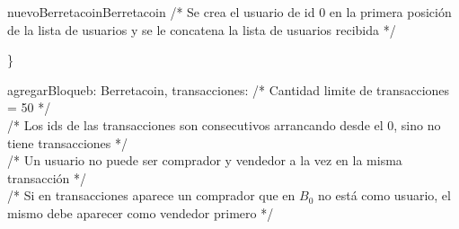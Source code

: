 \documentclass[10pt,a4paper]{article}
\begin{document}
\begin{tcolorbox}
        \begin{proc}{nuevoBerretacoin}{}{Berretacoin}
            \textcolor{babyblue}{/* Se crea el usuario de id 0 en la primera posición de la lista de usuarios y se le concatena la lista de usuarios recibida */} \\
        \end{proc} \}
        \vspace{0.3em}
        \begin{proc}{agregarBloque}{\Inout b: Berretacoin, \In transacciones: }{}
            \textcolor{babyblue}{/* Cantidad limite de transacciones = 50 */} \\
            \textcolor{babyblue}{/* Los ids de las transacciones son consecutivos arrancando desde el 0, sino no tiene transacciones */} \\
            \textcolor{babyblue}{/* Un usuario no puede ser comprador y vendedor a la vez en la misma transacción */} \\
            \textcolor{babyblue}{/* Si en transacciones aparece un comprador que en $B_0$ no está como usuario, el mismo debe aparecer como vendedor primero */} \\
\end{proc}
\end{tcolorbox}
\end{document}
